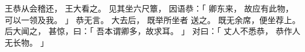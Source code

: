 
\switchcolumn*[\section{}]

王恭从会稽还，
王大看之。
见其坐六尺簟，
因语恭：「
    卿东来，
    故应有此物，
    可以一领及我。
」
恭无言。
大去后，
既举所坐者
送之。
既无余席，便坐荐上。
后大闻之，
甚惊，曰：「
    吾本谓卿多，故求耳。
」
对曰：「
    丈人不悉恭，
    恭作人无长物。
」

\switchcolumn


